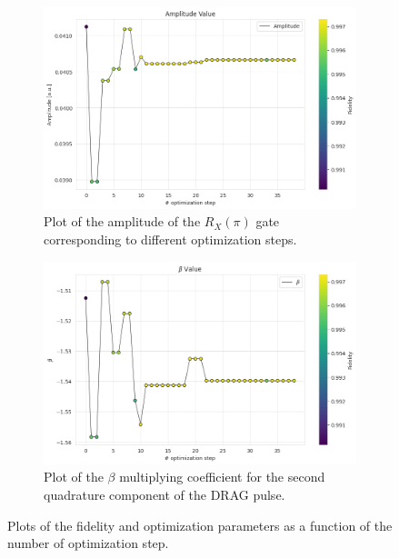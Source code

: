 \begin{figure}[h!]
    \begin{subfigure}[t]{0.45\textwidth}
        \includegraphics[width=\textwidth]{figures/png/RB_optimization/NM/post_ft_true/amplitude.png}
        \caption{Plot of the amplitude of the $R_X(\pi)$ gate corresponding to different optimization steps.}
        \label{NM_true_fig:amplitude}
    \end{subfigure}
    \hfill
    \begin{subfigure}[t]{0.45\textwidth}
        \includegraphics[width=\textwidth]{figures/png/RB_optimization/NM/post_ft_true/beta.png}
        \caption{Plot of the $\beta$ multiplying coefficient for the second quadrature component of the DRAG pulse.}
        \label{NM_true_fig:beta}
    \end{subfigure}

    \caption{Plots of the fidelity and optimization parameters as a function of the number of optimization step.}
    \label{fig:NM_plots}
\end{figure}

